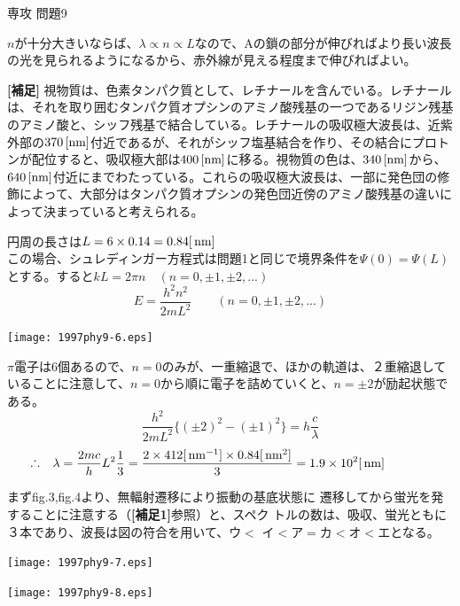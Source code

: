 \documentclass[fleqn]{jbook}
\begin{document}
\begin{answer}{専攻 問題9}{}
\begin{subanswers}
\begin{subsubanswers}
$n$が十分大きいならば、$\lambda \propto n \propto L$なので、Aの鎖の部分が伸びればより長い波長の光を見られるようになるから、赤外線が見える程度まで伸びればよい。

{\bf{ [補足]}}
視物質は、色素タンパク質として、レチナールを含んでいる。レチナールは、それを取り囲むタンパク質オプシンのアミノ酸残基の一つであるリジン残基のアミノ酸と、シッフ残基で結合している。レチナールの吸収極大波長は、近紫外部の$370{\,{\rm [nm]}}$付近であるが、それがシッフ塩基結合を作り、その結合にプロトンが配位すると、吸収極大部は$400\,{\rm [nm]}$に移る。視物質の色は、$340\,{\rm [nm]}$から、$640\,{\rm [nm]}$付近にまでわたっている。これらの吸収極大波長は、一部に発色団の修飾によって、大部分はタンパク質オプシンの発色団近傍のアミノ酸残基の違いによって決まっていると考えられる。
\end{subsubanswers}

\SubAnswer
円周の長さは$L=6\times 0.14=0.84[\,{\rm nm}]$\\
この場合、シュレディンガー方程式は問題1と同じで境界条件を$\Psi(0)=\Psi(L)$
とする。すると$kL=2\pi n \quad (n=0,\pm 1,\pm 2,...)$
\[
E=\frac{h^2n^2}{2mL^2}\qquad (n=0,\pm 1, \pm 2,...)
\]
\parbox[t]{60mm}{
\begin{center}
\texttt{[image: 1997phy9-6.eps]}
\end{center}
}\parbox[t]{100mm}{$\pi$電子は6個あるので、$n=0$のみが、一重縮退で、ほかの軌道は、２重縮退していることに注意して、$n=0$から順に電子を詰めていくと、$n=\pm 2$が励起状態である。
\[
\frac{h^2}{2mL^2}\{(\pm 2)^2-(\pm 1)^2\}=h\frac{c}{\lambda}
\]
\[ \hspace{-13mm}\Yueni
\lambda=\frac{2mc}{h}L^2\frac{1}{3}=\frac{2\times 412[{\Unit{nm}}^{-1}]
\times 0.84[{\Unit{nm}}^2]}{3}=1.9\times 10^2 [{\Unit{nm}}]
\]
}

\SubAnswer
\begin{subsubanswers}
\SubSubAnswer

\parbox[t]{60mm}{まずfig.3,fig.4より、無輻射遷移により振動の基底状態に
遷移してから蛍光を発することに注意する（{\bf{[補足1]}}参照）と、スペク
トルの数は、吸収、蛍光ともに３本であり、波長は図の符合を用いて、ウ$<$
イ$<$ア$=$カ$<$オ$<$エとなる。}
\parbox[t]{50mm}{
\begin{center}
\texttt{[image: 1997phy9-7.eps]}
\end{center}}
\parbox[t]{50mm}{\vspace*{-5mm}
\begin{center}
\texttt{[image: 1997phy9-8.eps]}
\end{center}}


\end{subsubanswers}
\end{subanswers}
\end{answer}
\end{document}
